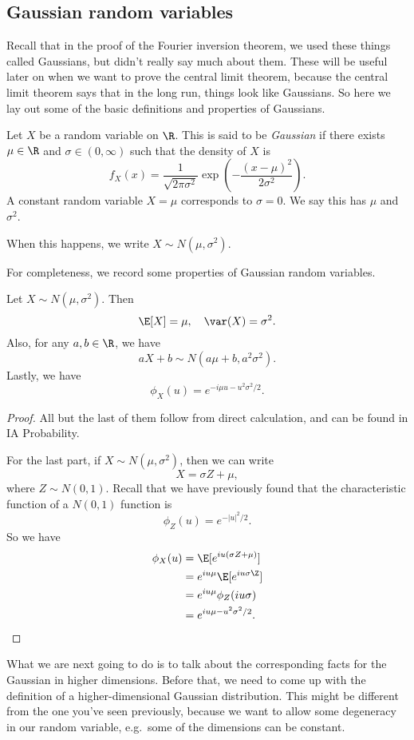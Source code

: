 \documentclass[a4paper]{article}
\begin{document}
\subsection{Gaussian random variables}
Recall that in the proof of the Fourier inversion theorem, we used these things called Gaussians, but didn't really say much about them. These will be useful later on when we want to prove the central limit theorem, because the central limit theorem says that in the long run, things look like Gaussians. So here we lay out some of the basic definitions and properties of Gaussians.

\begin{defi}
  Let $X$ be a random variable on $\R$. This is said to be \emph{Gaussian} if there exists $\mu \in \R$ and $\sigma \in (0, \infty)$ such that the density of $X$ is
  \[
    f_X(x) = \frac{1}{\sqrt{2\pi \sigma^2}} \exp\left(-\frac{(x - \mu)^2}{2 \sigma^2}\right).
  \]
  A constant random variable $X = \mu$ corresponds to $\sigma = 0$. We say this has  $\mu$ and  $\sigma^2$.

  When this happens, we write $X \sim N(\mu, \sigma^2)$.
\end{defi}

For completeness, we record some properties of Gaussian random variables.

\begin{prop}
  Let $X \sim N(\mu, \sigma^2)$. Then
  \[
    \E[X] = \mu,\quad \var(X) = \sigma^2.
  \]
  Also, for any $a, b \in \R$, we have
  \[
    aX + b \sim N(a\mu + b, a^2 \sigma^2).
  \]
  Lastly, we have
  \[
    \phi_X(u) = e^{-i\mu u - u^2 \sigma^2/2}.
  \]
\end{prop}

\begin{proof}
  All but the last of them follow from direct calculation, and can be found in IA Probability.

  For the last part, if $X \sim N(\mu, \sigma^2)$, then we can write
  \[
    X = \sigma Z + \mu,
  \]
  where $Z \sim N(0, 1)$. Recall that we have previously found that the characteristic function of a $N(0, 1)$ function is
  \[
    \phi_Z(u) = e^{-|u|^2/2}.
  \]
  So we have
  \begin{align*}
    \phi_X(u) &= \E[e^{iu(\sigma Z + \mu)}]\\
    &= e^{iu\mu} \E[e^{iu\sigma \Z}]\\
    &= e^{iu\mu} \phi_Z(iu\sigma)\\
    &= e^{iu \mu - u^2 \sigma^2/2}.\qedhere
  \end{align*}
\end{proof}
What we are next going to do is to talk about the corresponding facts for the Gaussian in higher dimensions. Before that, we need to come up with the definition of a higher-dimensional Gaussian distribution. This might be different from the one you've seen previously, because we want to allow some degeneracy in our random variable, e.g.\ some of the dimensions can be constant.
\end{document}
